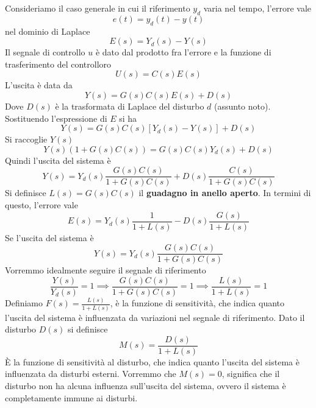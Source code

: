 \documentclass[10pt, letterpaper]{report}
\begin{document}
Consideriamo il caso generale in cui il riferimento $y_d$ varia nel tempo, l'errore vale 
 $$ e(t)=y_d(t)-y(t)$$
 nel dominio di Laplace 
$$E(s)=Y_d(s)-Y(s)$$
Il segnale di controllo $u$ è dato dal prodotto fra l'errore e la funzione di trasferimento del controlloro 
$$ U(s)=C(s)E(s)$$ 
L'uscita è data da 
$$Y(s)=G(s)C(s)E(s)+D(s)$$
Dove $D(s)$ è la trasformata di Laplace del disturbo $d$ (assunto noto).
Sostituendo l'espressione di $E$ si ha 
$$Y(s)=G(s)C(s)[Y_d(s)-Y(s)]+D(s)$$
Si raccoglie $Y(s)$
$$ Y(s)(1+G(s)C(s))=G(s)C(s)Y_d(s)+D(s)$$
Quindi l'uscita del sistema è 
$$ Y(s)=Y_d(s)\frac{G(s)C(s)}{1+G(s)C(s)}+D(s)\frac{C(s)}{1+G(s)C(s)}$$
Si definisce $L(s)=G(s)C(s)$ il \textbf{guadagno in anello aperto}. In termini di questo, l'errore vale 
$$ E(s)=Y_d(s)\frac{1}{1+L(s)}-D(s)\frac{G(s)}{1+L(s)}$$
Se l'uscita del sistema è 
$$ Y(s)=Y_d(s)\frac{G(s)C(s)}{1+G(s)C(s)}$$
Vorremmo idealmente seguire il segnale di riferimento $$\frac{Y(s)}{Y_d(s)}=1 \implies 
\frac{G(s)C(s)}{1+G(s)C(s)}=1\implies \frac{L(s)}{1+L(s)}=1$$
Definiamo $F(s)= \frac{L(s)}{1+L(s)}$, è la funzione di sensitività, che indica quanto l'uscita del sistema è influenzata da variazioni nel segnale di riferimento. Dato il disturbo $D(s)$ si definisce 
$$ M(s)=\frac{D(s)}{1+L(s)}$$
È la funzione di sensitività al disturbo, che indica quanto l'uscita del sistema è influenzata da disturbi esterni. Vorremmo che $M(s)=0$, significa che il disturbo non ha alcuna influenza sull'uscita del sistema, ovvero il sistema è completamente immune ai disturbi.
\end{document}
